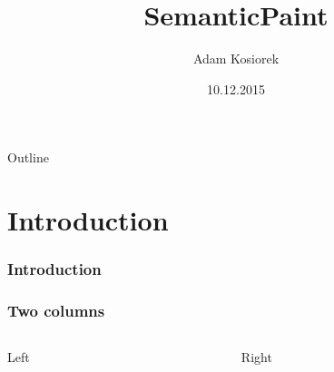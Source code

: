 \documentclass[mathserif]{beamer}
\title[short title]{SemanticPaint}
\author[short presentator]{Adam Kosiorek}
\institute[CAMP]{Computer Aided Medical Procedures \\
Technische Universit\"at M\"unchen}
\date[]{10.12.2015}
\begin{document}
%   
%   
% 
%   
%   
%   


\begin{frame}
\titlepage
\end{frame}


\begin{frame}{Outline}
\tableofcontents
\end{frame}


\section{Introduction}
\begin{frame}
\frametitle{Introduction}

\end{frame}


\begin{frame}
\frametitle{Two columns}
\begin{columns}[t]
\begin{column}{0.45\linewidth}
Left
\end{column}
\begin{column}{0.45\linewidth}
Right
\end{column}
\end{columns}
\end{frame}


\end{document}
